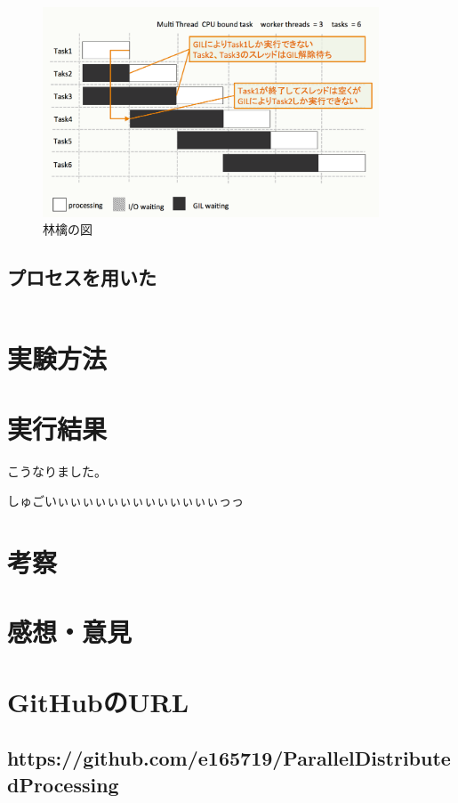 \documentclass[14pt, oneside]{article}     	%
\begin{document}
\begin{figure}[h]
  \centering
  \includegraphics[width=10cm]{multithred_cpubound.png}
  \caption{林檎の図}
\end{figure}

\subsection{プロセスを用いた}

\begin{lstlisting}[caption=シンプレクス法プログラム]

\end{lstlisting}

\section{実験方法}


\section{実行結果}

こうなりました。

しゅごいぃぃぃぃぃぃぃぃぃぃぃぃぃっっ


\section{考察}






\section{感想・意見}
\section*{GitHubのURL}

\subsection*{https://github.com/e165719/ParallelDistributedProcessing}
\end{document}
